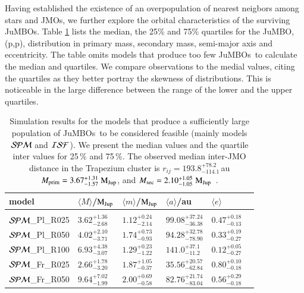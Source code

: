 \documentclass[submission,phys]{lib/SciPost}
\newcommand{\MJup}{\mbox{$\mathrm{{M}}_{\rm Jup}$}}
\newcommand{\jumbos}{\mbox{JuMBOs}}
\begin{document}
Having established the existence of an overpopulation of nearest
neigbors among stars and JMOs, we further explore the orbital
characteristics of the surviving \jumbos.  Table
\ref{Tab:orbital_distributions} lists the median, the 25\% and 75\%
quartiles for the JuMBO, (p,p), distribution in primary mass,
secondary mass, semi-major axis and eccentricity. The table omits
models that produce too few \jumbos\, to calculate the median and
quartiles. We compare observations to the medial values, citing the
quartiles as they better portray the skewness of distributions.  This
is noticeable in the large difference between the range of the lower
and the upper quartiles.


\begin{table}
  \caption{Simulation results for the models that produce a
    sufficiently large population of \jumbos\, to be considered
    feasible (mainly models ${\cal SPM}$ and ${\cal ISF}$). We present
    the median values and the quartile inter values for 25\,\% and
    75\,\%.  The observed median inter-JMO distance in the Trapezium
    cluster is $r_{ij} = 193.8^{+78.2}_{-114.1}$\,au $M_{\rm prim} =
    3.67^{+1.31}_{-1.57}$\,\MJup, and $M_{\rm sec} =
    2.10^{+1.05}_{-1.05}$\,\MJup\, \cite{2023arXiv231001231P}.  }
\label{Tab:orbital_distributions}
 \centering 
 \begin{tabular}{llllll}
 \hline\hline
model&$\langle M \rangle$/\MJup & $\langle m \rangle$/\MJup & $\langle a \rangle$/au & $\langle e \rangle$ \\
 \hline \vspace{-0.75em} \\ 
 ${\cal SPM}$\_Pl\_R025 & $3.62^{+1.36}_{-2.68}$ & $1.12^{+0.24}_{-2.14}$ & $99.08^{+37.24}_{-36.38}$ & $0.47^{+0.18}_{-0.13}$ \vspace{0.25em}\\
 ${\cal SPM}$\_Pl\_R050 & $4.02^{+2.10}_{-3.71}$ & $1.74^{+0.73}_{-0.93}$ & $94.28^{+32.78}_{-78.90}$ & $0.33^{+0.19}_{-0.27}$ \vspace{0.25em}\\  
 ${\cal SPM}$\_Pl\_R100 & $6.93^{+4.38}_{-3.07}$ & $1.29^{+0.23}_{-1.22}$ & $141.0^{+37.1}_{-11.2}$ & $0.12^{+0.05}_{-0.27}$ \vspace{0.25em}\\
 ${\cal SPM}$\_Fr\_R025 & $2.66^{+1.78}_{-3.20}$ & $1.87^{+1.05}_{-0.37}$ & $35.56^{+20.57}_{-62.84}$ & $0.80^{+0.10}_{-0.18}$ \vspace{0.25em}\\ 
 ${\cal SPM}$\_Fr\_R050 & $9.64^{+7.02}_{-1.99}$ & $2.00^{+0.69}_{-0.58}$ & $82.76^{+21.74}_{-83.04}$ & $0.56^{+0.29}_{-0.18}$ \vspace{0.25em}\\ 

\end{tabular}
\end{table}
\end{document}
